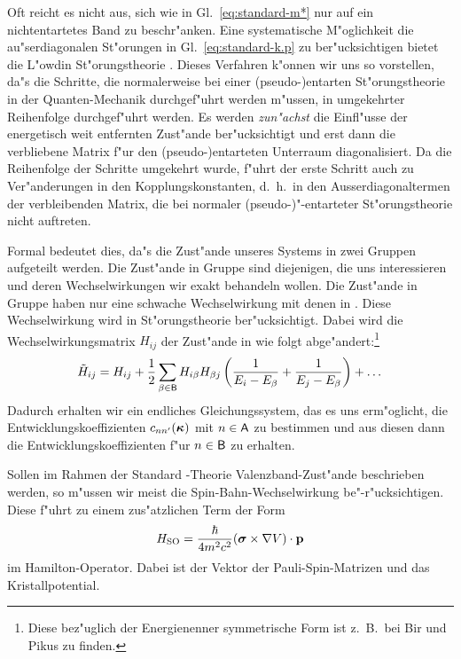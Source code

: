 Oft reicht es nicht aus, sich wie in Gl.~\eqref{eq:standard-m*} nur auf ein
nichtentartetes Band zu beschr"anken. Eine systematische M"oglichkeit die
au"serdiagonalen St"orungen in Gl.~\eqref{eq:standard-k.p} zu ber"ucksichtigen
bietet die L"owdin St"orungstheorie \cite{lowd:51}.
Dieses Verfahren k"onnen wir uns so vorstellen, da"s die 
Schritte, die normalerweise bei einer (pseudo-)entarten St"orungstheorie in
der Quanten-Mechanik durchgef"uhrt werden m"ussen, in umgekehrter Reihenfolge
durchgef"uhrt werden. Es werden
\emph{zun"achst} die Einfl"usse der energetisch weit entfernten Zust"ande
ber"ucksichtigt und erst dann die verbliebene Matrix f"ur den
(pseudo-)entarteten Unterraum diagonalisiert. Da die Reihenfolge der Schritte
umgekehrt wurde, f"uhrt der erste Schritt auch zu Ver"anderungen in den
Kopplungskonstanten, d.~h.\ in den Ausserdiagonaltermen der verbleibenden
Matrix, die bei normaler (pseudo-)"-entarteter St"orungstheorie nicht
auftreten.

Formal bedeutet dies, da"s die Zust"ande unseres Systems in zwei
Gruppen aufgeteilt werden. Die Zust"ande in Gruppe  sind diejenigen,
die uns interessieren und deren Wechselwirkungen wir exakt behandeln wollen.
Die Zust"ande in Gruppe  haben nur eine schwache Wechselwirkung mit
denen in . Diese Wechselwirkung wird in St"orungstheorie
ber"ucksichtigt.  Dabei wird die Wechselwirkungsmatrix $H_{i j}$ der Zust"ande
in  wie folgt abge"andert:\footnote{Diese bez"uglich der Energienenner
  symmetrische Form ist z.~B.\ bei Bir und Pikus \cite{bipi:74} zu finden.}
%
\begin{displaymath}
  \tilde{H}_{ij} = H_{ij} + \frac{1}{2} \sum_{\beta \in \mathsf{B}} H_{i \beta}
  H_{\beta j} \left( \frac{1}{E_{i}-E_{\beta}} + \frac{1}{E_{j}-E_{\beta}}
  \right) + \dots
\end{displaymath}
%
Dadurch erhalten wir ein endliches Gleichungssystem, das es uns erm"oglicht,
die Entwicklungskoeffizienten $c_{n\pri{n}}(\ak)$ mit $n \in \mathsf{A}$ zu
bestimmen und aus diesen dann die Entwicklungskoeffizienten f"ur $n \in
\mathsf{B}$ zu erhalten.

Sollen im Rahmen der Standard \kdotp-Theorie Valenzband-Zust"ande beschrieben
werden, so m"ussen wir meist die Spin-Bahn-Wechselwirkung
be"-r"ucksichtigen. Diese f"uhrt zu einem zus"atzlichen Term der Form 
%
\begin{equation}
  \label{eq:Spin-Bahn}
  \op{H_{\text{SO}}} = \frac{\hbar}{4m^{2}c^{2}} (\grvecop{\sigma} \times
  \nabla\op{V}) \cdot \vecop{p}
\end{equation}
%
im Hamilton-Operator. Dabei ist \grvecop{\sigma} der Vektor der
Pauli-Spin-Matrizen und  das Kristallpotential.

